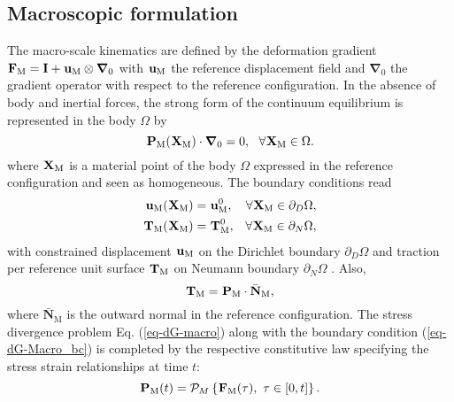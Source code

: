 \subsection{Macroscopic formulation}\label{ch-form-macro}
The macro-scale kinematics are defined by the deformation gradient $\tgm[]{F}=\textbf{I}+\tgm[]{u}\otimes\bm\nabla_0$ 
with $ \tgm{u} $ the reference displacement field and $ \bm\nabla_0 $ the gradient operator with respect to the reference configuration. In the absence of body and inertial forces, the strong form of the continuum equilibrium is represented in the body $\Omega$ by
\begin{equation}
	\tgm[]{P}(\tgm[]{X})\cdot\bm\nabla_0
	=0,\,\,\,\,\forall\tgm[]{X}\in\Omega.\label{eq-dG-macro}
\end{equation}
where $ \tgm{X} $ is a material point of the body $ \Omega $ expressed in the reference configuration and seen as homogeneous. The boundary conditions read
\begin{subequations}\label{eq-dG-Macro_bc}
	\begin{align}
	\tgm[]{u}(\tgm[]{X}) & =\tgm[]{u}^0, & \forall\tgm[]{X}\in\partial_D\Omega,\\
	\tgm[]{T}(\tgm[]{X}) & =\tgm[]{T}^0, & \forall\tgm[]{X}\in\partial_N\Omega,
	\end{align}
\end{subequations}
with constrained displacement $\tgm[]{u}$ on the Dirichlet boundary $ \partial_D\Omega $ and traction per reference unit surface $\tgm[]{T}$ on Neumann boundary $ \partial_N\Omega $
. Also, 
\begin{equation}\label{eq-DG-bc_exp}
		\tgm[]{T}  = 
		\tgm[]{P}
		\cdot\bar{\mathbf{N}}_\text{M},
\end{equation}
where $\bar{\mathbf{N}}_\text{M}$ is the outward normal in the reference configuration. The stress divergence problem Eq. (\ref{eq-dG-macro}) along with the boundary condition (\ref{eq-dG-Macro_bc}) is completed by the respective constitutive law specifying the stress strain relationships at time $ t $:
\begin{equation}\label{eq-dG-const_macro-1}
	\tgm[]{P}(t) = \mathcal{P}_M\left\{\tgm[]{F}(\tau)
	,\,\,\tau\in\left[0,t\right]\right\}.
\end{equation}

